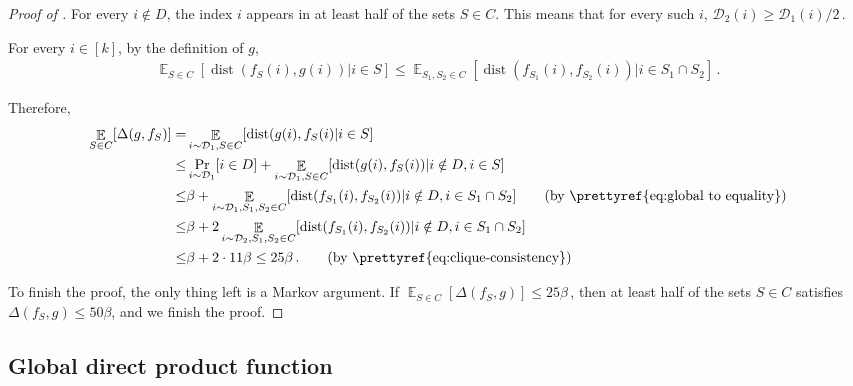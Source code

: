\documentclass{toc}
\DeclareMathOperator*{\E}{\mathbb{E}} %
\newcommand{\Ex}[2][]{\E_{{#1}}\Brac{#2}} %
\newcommand{\Brac}[1]{\left[#1\right]} %
\newcommand\f{f} %
\newcommand\setf{f} %
\newcommand\pf{g} %
\DeclareMathOperator{\dist}{dist} %
\newcommand{\diff}{\Delta} %
\begin{document}
\begin{proof}[Proof of ]
	For every $i\notin D$, the index $i$ appears in at least half of the sets $S\in C$. This means that for every such $i$, $\mathcal{D}_2(i)\geq 
	\mathcal{D}_1(i)/2$\,. %
	
	For every $i\in[k]$, by the definition of $\pf$,
	\begin{align}\label{eq:global to equality}
	\E_{S\in C}[\dist(\setf_S(i),\pf(i))|i\in S] \leq
	\E_{S_1,S_2\in C}[\dist(\setf_{S_1}(i),\setf_{S_2}(i))|i\in S_1\cap S_2]\,. %
	\end{align}
	
	
	Therefore,
	\begin{align*}
	 \E_{S\in C}[\Delta(\pf,\f_S)] =&   \E_{i\sim\mathcal{D}_1,S\in C}[\dist(\pf(i),\f_S(i)|i\in S] \\
	 \leq& \Pr_{i\sim\mathcal{D}_1}[i\in D] + \E_{i\sim\mathcal{D}_1,S\in C}[\dist(\pf(i),\f_S(i))| i\notin D,i\in S]\\
	 \leq& \beta + \E_{i\sim\mathcal{D}_1,S_1,S_2\in C}[\dist(\f_{S_1}(i),\f_{S_2}(i))| i\notin D,i\in S_1\cap S_2] \tag{by \prettyref{eq:global to equality}}\\
	 \leq& \beta + 2\E_{i\sim\mathcal{D}_2,S_1,S_2\in C}[\dist(\f_{S_1}(i),\f_{S_2}(i))| i\notin D,i\in S_1\cap S_2] \\
	 \leq& \beta+ 2\cdot11\beta \leq 25\beta\,. 
	 \tag{\text{by \prettyref{eq:clique-consistency}}} %
	\end{align*}
	
	To finish the proof, the only thing left is a Markov argument. If $\Ex[S\in C]{\diff(\setf_S,\pf)} \leq 25\beta$\,, then at least half of the sets $S\in C$ satisfies $\diff(\setf_S,\pf) \leq 50\beta$, and we finish the proof.
\end{proof}



\subsection{Global direct product function} \label{sec:inputs}
\end{document}

